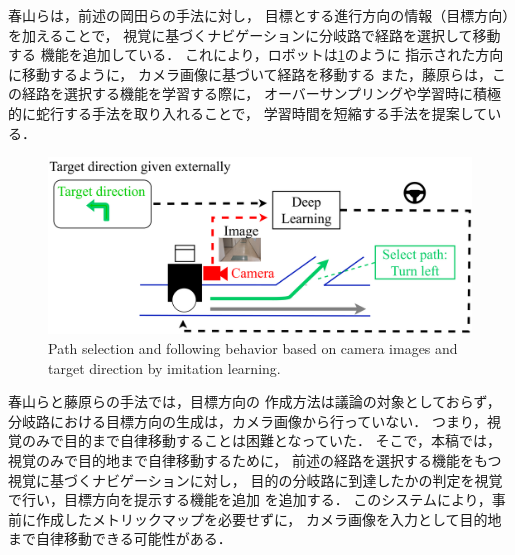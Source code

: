春山らは，前述の岡田らの手法に対し，
目標とする進行方向の情報（目標方向）を加えることで，
視覚に基づくナビゲーションに分岐路で経路を選択して移動する
機能を追加している．
これにより，ロボットは\ref{fig:haru_select}のように
指示された方向に移動するように，
カメラ画像に基づいて経路を移動する
また，藤原らは，この経路を選択する機能を学習する際に，
オーバーサンプリングや学習時に積極的に蛇行する手法を取り入れることで，
学習時間を短縮する手法を提案している．

 \begin{figure}[htbp]
     \centering
      \includegraphics[width=130mm]{images/pdf/learning_gamma.pdf}
      \caption{Path selection and following behavior based 
      on camera images and target direction by imitation learning.}\label{fig:haru_select}
 \end{figure}

春山らと藤原らの手法では，目標方向の
作成方法は議論の対象としておらず，
分岐路における目標方向の生成は，カメラ画像から行っていない．
つまり，視覚のみで目的まで自律移動することは困難となっていた．
そこで，本稿では，視覚のみで目的地まで自律移動するために，
前述の経路を選択する機能をもつ視覚に基づくナビゲーションに対し，
目的の分岐路に到達したかの判定を視覚で行い，目標方向を提示する機能を追加
を追加する．
このシステムにより，事前に作成したメトリックマップを必要せずに，
カメラ画像を入力として目的地まで自律移動できる可能性がある．
\newpage
